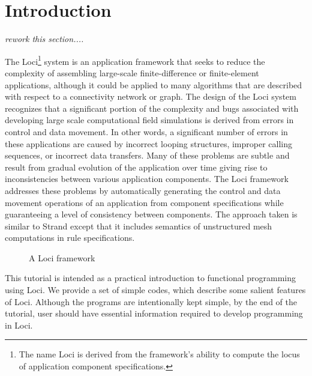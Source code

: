 \chapter {Introduction}

{\it rework this section....}

The Loci\footnote{\scriptsize The name Loci is derived from the
  framework's ability to compute the locus of application component
  specifications.} system is an application framework that seeks to
reduce the complexity of assembling large-scale finite-difference or
finite-element applications, although it could be applied to many
algorithms that are described with respect to a connectivity network or
graph.  The design of the Loci system recognizes that a significant
portion of the complexity and bugs associated with developing large
scale computational field simulations is derived from errors in
control and data movement.  In other words, a significant number of
errors in these applications are caused by incorrect looping
structures, improper calling sequences, or incorrect data transfers.
Many of these problems are subtle and result from gradual evolution of
the application over time giving rise to inconsistencies between
various application components.  The Loci framework addresses these
problems by automatically generating the control and data movement
operations of an application from component specifications while
guaranteeing a level of consistency between components.  The approach
taken is similar to Strand \cite{Foster.90} except that it includes
semantics of unstructured mesh computations in rule specifications.
%
\begin{figure}[h]
\vspace{1.5in}\caption {  A Loci framework }
\end{figure}
%
This tutorial is intended as a practical introduction to functional 
programming using Loci. We provide a set of simple codes, which 
describe some salient features of Loci. Although the programs are
intentionally kept simple, by the end of the tutorial, user should
have essential information required to develop programming in Loci. 
